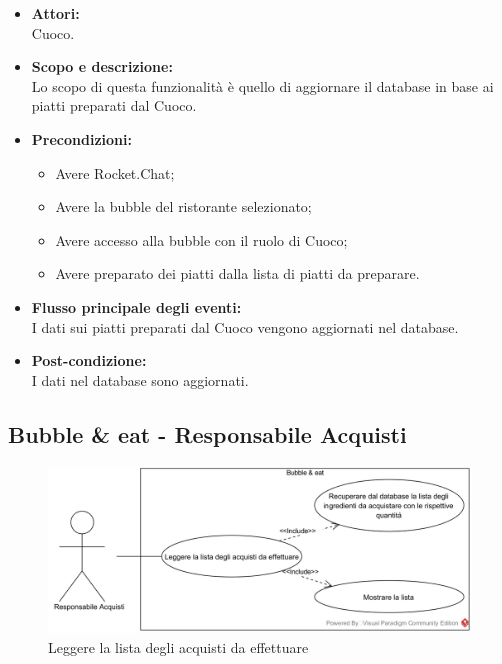 
\begin{itemize}
	\item \textbf{Attori:}
	\\Cuoco.
	\item \textbf{Scopo e descrizione:} 
	\\Lo scopo di questa funzionalità è quello di aggiornare il database in base ai piatti preparati dal Cuoco.
	\item \textbf{Precondizioni:}
	\begin{itemize}
		\item Avere Rocket.Chat;
		\item Avere la bubble del ristorante selezionato;
		\item Avere accesso alla bubble con il ruolo di Cuoco;
		\item Avere preparato dei piatti dalla lista di piatti da preparare.
	\end{itemize}
	\item \textbf{Flusso principale degli eventi:}
	\\I dati sui piatti preparati dal Cuoco vengono aggiornati nel database.
	\item \textbf{Post-condizione:}
	\\I dati nel database sono aggiornati.
\end{itemize}

\subsection{Bubble \& eat - Responsabile Acquisti}


\begin{figure}[H]
	\centering
	\includegraphics[width=15cm]{../../documenti/AnalisiDeiRequisiti/Diagrammi_img/uc3_7.png}
	\caption{\UCCaption{} Leggere la lista degli acquisti da effettuare}
\end{figure}

